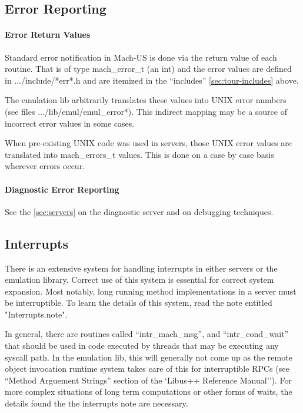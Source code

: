 \subsection{Error Reporting}
\paragraph{Error Return Values}
Standard error notification in Mach-US is done via the return value of
each routine.  That is of type mach\_error\_t (an int) and the error values are
defined in .../include/*err*.h and are itemized in the ``includes'' {\SECREF}
\ref{sec:tour-includes} above.

The emulation lib arbitrarily translates these values into UNIX error
numbers (see files .../lib/emul/emul\_error*).  This indirect mapping
may be a source of incorrect error values in some cases.

When pre-existing UNIX code was used in servers,
those UNIX error values
are translated into mach\_errors\_t values.  This is done on a case by case
basis wherever errors occur.

\paragraph{Diagnostic Error Reporting}
See the {\SECREF} \ref{sec:servers} on the diagnostic server and 
{\SECREF} \label{sec:debug-technique}
on debugging techniques.
{\MORE}

\subsection{Interrupts}
There is an extensive system for handling interrupts in either servers
or the emulation library.  Correct use of this system is essential for
correct system expansion.  Most notably, long running method implementations
in a server must be interruptible.  To learn the details of this system, read
the note entitled "Interrupts.note".

In general, there are
routines called ``intr\_mach\_msg'', and ``intr\_cond\_wait''
that should be used in code executed by threads that may be executing
any syscall path.  In the emulation lib,  this will generally not come up
as the remote object invocation runtime system takes care of this
for interruptible RPCs (see ``Method Arguement Strings'' section of the
`Libus++ Reference Manual''). 
For more complex situations of long term computations or other forms of waits,
the details found the the interrupts note are necessary.

